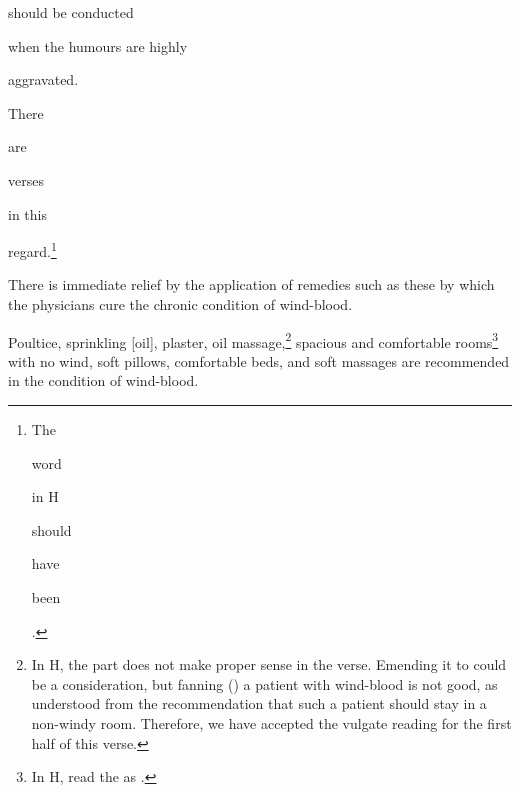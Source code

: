 \begin{translation}
\begin{tt}
        should
        be
        conducted

        when
        the
        humours
        are
        highly

        aggravated.

        \item[13]


        \item[14]

        There

        are

        verses

        in this

        regard.\footnote{The

            word


            in H

            should

            have

            been

            .}

        \begin{sloka}

            There is immediate relief by the application of remedies such as these by
            which the physicians cure the chronic condition of wind-blood.

        \end{sloka}


        \item[15-16]

        \begin{sloka}

            Poultice, sprinkling [oil], plaster, oil massage,\footnote{In H, the part
                 does not make proper sense in the verse. Emending it to
                 could be a consideration, but fanning () a
                patient with wind-blood is not good, as understood from the recommendation
                that such a patient should stay in a non-windy room. Therefore, we have
                accepted the vulgate reading for the first half of this verse.} spacious and
            comfortable rooms\footnote{In H, read the   as
                .} with no wind, soft pillows, comfortable beds, and soft massages are
            recommended in the condition of wind-blood.

        \end{sloka}




\end{tt}
\end{translation}
